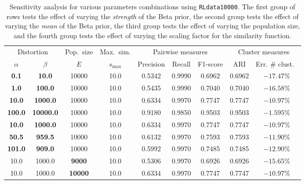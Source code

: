 \documentclass[12pt,letterpaper]{article}
\newcommand{\1}[1]{\mathbb{I}\!\left[#1\right]} %
\def\spacingset#1{\renewcommand{\baselinestretch}%
  {#1}\small\normalsize} \spacingset{1}
\begin{document}
\begin{table}
	\centering
  \caption{Sensitivity analysis for various parameters combinations 
  using \texttt{RLdata10000}. The first group of rows tests the effect of 
  varying the \emph{strength} of the Beta prior, the second group tests the 
  effect of varying the \emph{mean} of the Beta prior, the third group 
  tests the effect of varying the population size, and the fourth group 
  tests the effect of varying the scaling factor for the similarity function.}
	\label{tbl:sensitivity}
	\spacingset{1}
  \footnotesize
  \begin{center}
	\begin{tabular}{*{9}{c}}
		\toprule
		\multicolumn{2}{c}{Distortion} & Pop.\ size & Max.\ sim. & \multicolumn{3}{c}{Pairwise measures} & \multicolumn{2}{c}{Cluster measures} \\
		\cmidrule(lr){1-2} \cmidrule(lr){3-3} \cmidrule(lr){4-4} \cmidrule(lr){5-7} \cmidrule(lr){8-9}
		$\alpha$       & $\beta$          & $E$            & $s_{\mathrm{max}}$ & Precision & Recall & F1-score & ARI & Err. \# clust.\ \\
		\midrule 
    \textbf{0.1}   & \textbf{10.0}    & 10000          & 10.0          & 0.5342 & 0.9990 & 0.6962 & 0.6962 & $-17.47\%$ \\
    \textbf{1.0}   & \textbf{100.0}   & 10000          & 10.0          & 0.5435 & 0.9990 & 0.7040 & 0.7040 & $-16.58\%$ \\
    \textbf{10.0}  & \textbf{1000.0}  & 10000          & 10.0          & 0.6334 & 0.9970 & 0.7747 & 0.7747 & $-10.97\%$ \\
    \textbf{100.0} & \textbf{10000.0} & 10000          & 10.0          & 0.9180 & 0.9850 & 0.9503 & 0.9503 & $-1.595\%$ \\
    \midrule
    \textbf{10.0}  & \textbf{1000.0}  & 10000          & 10.0          & 0.6334 & 0.9970 & 0.7747 & 0.7747 & $-10.97\%$ \\
    \textbf{50.5}  & \textbf{959.5}   & 10000          & 10.0          & 0.6132 & 0.9970 & 0.7593 & 0.7593 & $-11.90\%$ \\
    \textbf{101.0} & \textbf{909.0}   & 10000          & 10.0          & 0.5992 & 0.9970 & 0.7485 & 0.7485 & $-12.90\%$ \\
    \midrule
    10.0           & 1000.0           & \textbf{9000}  & 10.0          & 0.5306 & 0.9970 & 0.6926 & 0.6926 & $-15.65\%$ \\
    10.0           & 1000.0           & \textbf{10000} & 10.0          & 0.6334 & 0.9970 & 0.7747 & 0.7747 & $-10.97\%$ \\

\end{tabular}
\end{center}
\end{table}
\end{document}

